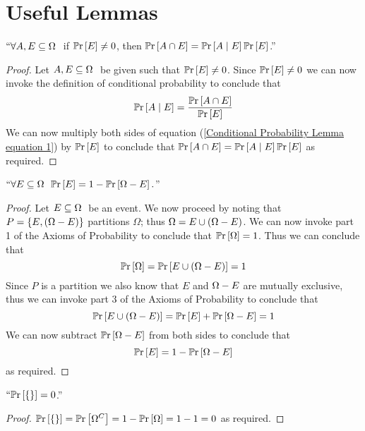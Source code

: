     \section{Useful Lemmas}
        \begin{lemma}
            $``\forall A, E \subseteq \Omega \ $ if $\mathbb{P}\mathrm{r} \left[E\right] \neq 0$, then
            $\mathbb{P}\mathrm{r} \left[A \cap E\right] = \mathbb{P}\mathrm{r}\left[A \mid E\right] \mathbb{P}\mathrm{r} \left[E\right]$.''
            \label{Conditional Probability Lemma}
        \end{lemma}
        \begin{proof}
            Let $A, E \subseteq \Omega \ $ be given such that $\mathbb{P}\mathrm{r} \left[E\right] \neq 0$.
            Since $\mathbb{P}\mathrm{r} \left[E\right] \neq 0$ we can now invoke the definition of conditional probability to
            conclude that
            \begin{equation}
                \mathbb{P}\mathrm{r}\left[A \mid E\right] = \frac{\mathbb{P}\mathrm{r} \left[A \cap E\right]}{\mathbb{P}\mathrm{r} \left[E\right]}
                \label{Conditional Probability Lemma equation 1}
            \end{equation}
            We can now multiply both sides of equation (\ref{Conditional Probability Lemma equation 1})
            by $\mathbb{P}\mathrm{r} \left[E\right]$ to conclude that $\mathbb{P}\mathrm{r} \left[A \cap E\right] = \mathbb{P}\mathrm{r}\left[A \mid E\right] \mathbb{P}\mathrm{r} \left[E\right]$ as
            required. \QED
        \end{proof}
        \begin{lemma}
            $``\forall E \subseteq \Omega \  \ \mathbb{P}\mathrm{r} \left[E\right] = 1 - \mathbb{P}\mathrm{r} \left[\Omega - E\right].$''
            \label{Complement Lemma}
        \end{lemma}
        \begin{proof}
            Let $E \subseteq \Omega \ $ be an event. We now proceed by noting that
            $P = \left\{E, \left(\Omega - E\right)\right\}$ partitions $\Omega$; thus
            $\Omega = E \cup \left(\Omega - E\right)$.
            We can now invoke part 1 of the Axioms of Probability to conclude that
            $\mathbb{P}\mathrm{r} \left[\Omega\right] = 1$. Thus we can conclude that 
            \[
                \mathbb{P}\mathrm{r} \left[\Omega\right] = \mathbb{P}\mathrm{r} \left[E \cup \left(\Omega - E\right)\right] = 1
            \]
            Since $P$ is a partition we also know that $E$ and $\Omega - E$ are
            mutually exclusive, thus we can invoke part 3 of the Axioms of Probability
            to conclude that
            \[
                \mathbb{P}\mathrm{r} \left[E \cup \left(\Omega - E\right)\right] = \mathbb{P}\mathrm{r} \left[E\right] + \mathbb{P}\mathrm{r} \left[\Omega - E\right] = 1
            \]
            We can now subtract $\mathbb{P}\mathrm{r} \left[\Omega - E\right]$ from both sides to conclude that
            \[
                \mathbb{P}\mathrm{r} \left[E\right] = 1 - \mathbb{P}\mathrm{r} \left[\Omega - E\right]
            \]
            as required. \QED
        \end{proof}
        \begin{corollary}
            $``\mathbb{P}\mathrm{r} \left[\left\{\right\}\right] = 0$.''
        \end{corollary}
        \begin{proof}
            $\mathbb{P}\mathrm{r} \left[\left\{\right\}\right] = \mathbb{P}\mathrm{r} \left[\Omega^{C}\right] = 1 - \mathbb{P}\mathrm{r} \left[\Omega\right] = 1 - 1 = 0$ as required. \QED
        \end{proof}
